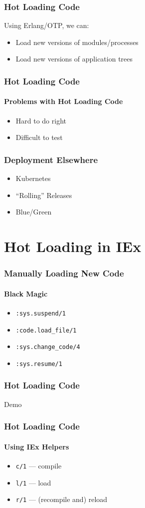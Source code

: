 \documentclass{beamer}
\begin{document}
\begin{frame}
\frametitle{Hot Loading Code}
Using Erlang/OTP, we can:
\begin{itemize}
\item{Load new versions of modules/processes}
\item{Load new versions of application trees}
\end{itemize}
\end{frame}

\begin{frame}
\frametitle{Hot Loading Code}
\framesubtitle{Problems with Hot Loading Code}
\begin{itemize}
\item{Hard to do right}
\item{Difficult to test}
\end{itemize}
\end{frame}

\begin{frame}
\frametitle{Deployment Elsewhere}
\begin{itemize}
\item{Kubernetes\cite{website:kubernetes}}
\item{``Rolling'' Releases}
\item{Blue/Green\cite{website:bluegreendeployment_fowler}}
\end{itemize}
\end{frame}

\section{Hot Loading in IEx}

\begin{frame}
\frametitle{Manually Loading New Code}
\framesubtitle{Black Magic}
\begin{itemize}
\item{\texttt{:sys.suspend/1}}
\item{\texttt{:code.load\_file/1}}
\item{\texttt{:sys.change\_code/4}}
\item{\texttt{:sys.resume/1}}
\end{itemize}
\end{frame}

\begin{frame}
\frametitle{Hot Loading Code}
\Huge{Demo}
\end{frame}

\begin{frame}
\frametitle{Hot Loading Code}
\framesubtitle{Using IEx Helpers}
\begin{itemize}
\item{\texttt{c/1} --- compile}
\item{\texttt{l/1} --- load}
\item{\texttt{r/1} --- (recompile and) reload}
\end{itemize}
\end{frame}
\end{document}
